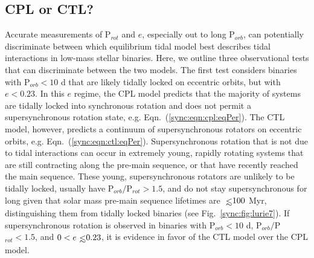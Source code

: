 

\subsection{CPL or CTL?} \label{sync:sec:whichModel}

Accurate measurements of P$_{rot}$ and $e$, especially out to long P$_{orb}$, can potentially discriminate between which equilibrium tidal model best describes tidal interactions in low-mass stellar binaries. Here, we outline three observational tests that can discriminate between the two models. The first test considers binaries with P$_{orb} < 10$ d that are likely tidally locked on eccentric orbits, but with $e < 0.23$.  In this $e$ regime, the CPL model predicts that the majority of systems are tidally locked into synchronous rotation and does not permit a supersynchronous rotation state, e.g. Eqn.~(\ref{sync:eqn:cpl:eqPer}). The CTL model, however, predicts a continuum of supersynchronous rotators on eccentric orbits, e.g. Eqn.~(\ref{sync:eqn:ctl:eqPer}). Supersynchronous rotation that is not due to tidal interactions can occur in extremely young, rapidly rotating systems that are still contracting along the pre-main sequence, or that have recently reached the main sequence.  These young, supersynchronous rotators are unlikely to be tidally locked, usually have P$_{orb}/$P$_{rot} > 1.5$, and do not stay supersynchronous for long given that solar mass pre-main sequence lifetimes are $\lsim 100$ Myr, distinguishing them from tidally locked binaries (see Fig.~\ref{sync:fig:lurie7}).   If supersynchronous rotation is observed in binaries with P$_{orb} < 10$ d, P$_{orb}/$P$_{rot} < 1.5$, and $0 < e \lsim 0.23$, it is evidence in favor of the CTL model over the CPL model. 

